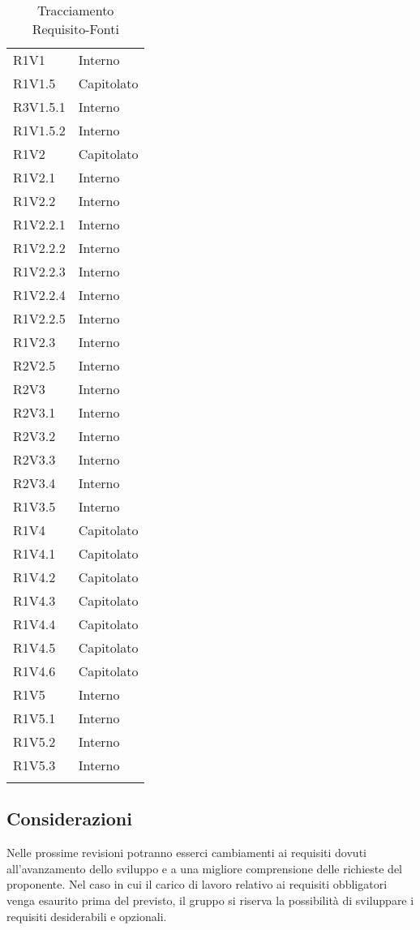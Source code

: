 \begin{longtable} {
			>{\centering}p{28mm}  
			>{}p{20mm}
		}
		R1V1 & Interno \TBstrut \\ [2mm]
		R1V1.5 & Capitolato \TBstrut \\ [2mm]
		R3V1.5.1 & Interno \TBstrut \\ [2mm]
		R1V1.5.2 & Interno \TBstrut \\ [2mm]
		R1V2 & Capitolato \TBstrut \\ [2mm]
		R1V2.1 & Interno \TBstrut \\ [2mm]
		R1V2.2 & Interno \TBstrut \\ [2mm]
		R1V2.2.1 & Interno \TBstrut \\ [2mm]
		R1V2.2.2 & Interno \TBstrut \\ [2mm]
		R1V2.2.3 & Interno \TBstrut \\ [2mm]
		R1V2.2.4 & Interno \TBstrut \\ [2mm]
		R1V2.2.5 & Interno \TBstrut \\ [2mm]
		R1V2.3 & Interno \TBstrut \\ [2mm]
		R2V2.5 & Interno \TBstrut \\ [2mm]
		R2V3 & Interno \TBstrut \\ [2mm]
		R2V3.1 & Interno \TBstrut \\ [2mm]
		R2V3.2 & Interno \TBstrut \\ [2mm]
		R2V3.3 & Interno \TBstrut \\ [2mm]
		R2V3.4 & Interno \TBstrut \\ [2mm]
		R1V3.5 & Interno \TBstrut \\ [2mm]
		R1V4 & Capitolato \TBstrut \\ [2mm]
		R1V4.1 & Capitolato \TBstrut \\ [2mm]
		R1V4.2 & Capitolato \TBstrut \\ [2mm]
		R1V4.3 & Capitolato \TBstrut \\ [2mm]
		R1V4.4 & Capitolato \TBstrut \\ [2mm]
		R1V4.5 & Capitolato \TBstrut \\ [2mm]
		R1V4.6 & Capitolato \TBstrut \\ [2mm]
		R1V5 & Interno \TBstrut \\ [2mm]
		R1V5.1 & Interno \TBstrut \\ [2mm]
		R1V5.2 & Interno \TBstrut \\ [2mm]
		R1V5.3 & Interno \TBstrut \\ [2mm]
		\rowcolor{white}
		\caption{Tracciamento Requisito-Fonti}
	\end{longtable}
	\subsection{Considerazioni}
	Nelle prossime revisioni potranno esserci cambiamenti ai requisiti dovuti all'avanzamento dello sviluppo e a una migliore comprensione delle richieste del proponente. Nel caso in cui il carico di lavoro relativo ai requisiti obbligatori venga esaurito prima del previsto, il gruppo si riserva la possibilità di sviluppare i requisiti desiderabili e opzionali.